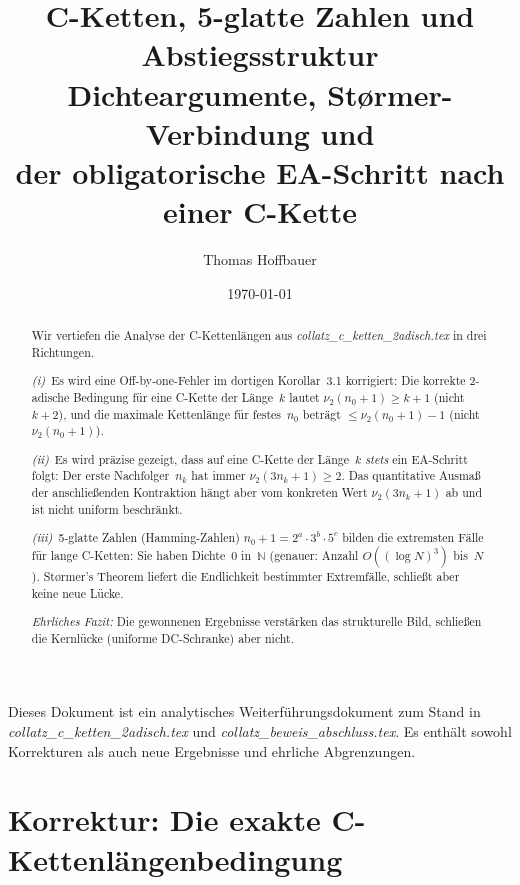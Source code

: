 \documentclass[12pt,a4paper]{article}
\title{%
	C-Ketten, 5-glatte Zahlen und Abstiegsstruktur\\[0.3em]
	\large Dichteargumente, Størmer-Verbindung und\\
	\large der obligatorische EA-Schritt nach einer C-Kette%
}
\author{Thomas Hoffbauer}
\date{\today}
\newcommand{\vii}{\nu_2}
\newcommand{\N}{\mathbb{N}}
\begin{document}
	\maketitle
	
	\begin{abstract}
		Wir vertiefen die Analyse der C-Kettenlängen aus \textit{collatz\_c\_ketten\_2adisch.tex}
		in drei Richtungen.
		
		\emph{(i)}~Es wird eine Off-by-one-Fehler im dortigen Korollar~3.1 korrigiert:
		Die korrekte 2-adische Bedingung für eine C-Kette der Länge~$k$ lautet
		$\vii(n_0+1) \geq k+1$ (nicht $k+2$), und die maximale Kettenlänge für festes~$n_0$
		beträgt $\leq \vii(n_0+1)-1$ (nicht $\vii(n_0+1)$).
		
		\emph{(ii)}~Es wird präzise gezeigt, dass auf eine C-Kette der Länge~$k$
		\emph{stets} ein EA-Schritt folgt: Der erste Nachfolger~$n_k$ hat immer
		$\vii(3n_k+1) \geq 2$.  Das quantitative Ausmaß der anschließenden Kontraktion
		hängt aber vom konkreten Wert $\vii(3n_k+1)$ ab und ist nicht uniform beschränkt.
		
		\emph{(iii)}~5-glatte Zahlen (Hamming-Zahlen) $n_0+1 = 2^a \cdot 3^b \cdot 5^c$
		bilden die extremsten Fälle für lange C-Ketten: Sie haben Dichte~$0$ in~$\N$
		(genauer: Anzahl $O((\log N)^3)$ bis~$N$). Størmer's Theorem liefert die
		Endlichkeit bestimmter Extremfälle, schließt aber keine neue Lücke.
		
		\emph{Ehrliches Fazit:} Die gewonnenen Ergebnisse verstärken das strukturelle
		Bild, schließen die Kernlücke (uniforme DC-Schranke) aber nicht.
	\end{abstract}
	
	\tableofcontents
	
	\bigskip
	\begin{tcolorbox}[warnung, title={Zur Einordnung}]
		Dieses Dokument ist ein analytisches Weiterführungsdokument zum Stand in
		\textit{collatz\_c\_ketten\_2adisch.tex} und \textit{collatz\_beweis\_abschluss.tex}.
		Es enthält sowohl Korrekturen als auch neue Ergebnisse und ehrliche Abgrenzungen.
	\end{tcolorbox}
	
	\section{Korrektur: Die exakte C-Kettenlängenbedingung}
	\label{sec:korrektur}
	
\end{document}
